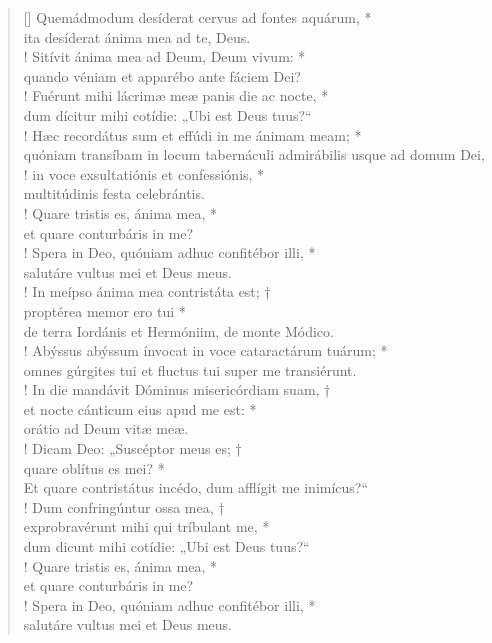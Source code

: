 \begin{verse}[\versewidth]
Quemádmodum desíderat cervus ad fontes aquárum, *\\
ita desíderat ánima mea ad te, Deus.\\!
\vin Sitívit ánima mea ad Deum, Deum vivum: *\\
\vin quando véniam et apparébo ante fáciem Dei?\\!
Fuérunt mihi lácrimæ meæ panis die ac nocte, *\\
dum dícitur mihi cotídie: „Ubi est Deus tuus?“\\!
\vin Hæc recordátus sum et effúdi in me ánimam meam; *\\
\vin quóniam transíbam in locum tabernáculi admirábilis usque ad domum Dei,\\!
in voce exsultatiónis et confessiónis, *\\
multitúdinis festa celebrántis.\\!
\vin Quare tristis es, ánima mea, *\\
\vin et quare conturbáris in me?\\!
Spera in Deo, quóniam adhuc confitébor illi, *\\
salutáre vultus mei et Deus meus.\\!
\vin In meípso ánima mea contristáta est; †\\
\vin proptérea memor ero tui *\\
\vin de terra Iordánis et Hermóniim, de monte Módico.\\!
Abýssus abýssum ínvocat in voce cataractárum tuárum; *\\
omnes gúrgites tui et fluctus tui super me transiérunt.\\!
\vin In die mandávit Dóminus misericórdiam suam, †\\
\vin et nocte cánticum eius apud me est: *\\
\vin orátio ad Deum vitæ meæ.\\!
Dicam Deo: „Suscéptor meus es; †\\
quare oblítus es mei? *\\
Et quare contristátus incédo, dum afflígit me inimícus?“\\!
\vin Dum confringúntur ossa mea, †\\
\vin exprobravérunt mihi qui tríbulant me, *\\
\vin dum dicunt mihi cotídie: „Ubi est Deus tuus?“\\!
Quare tristis es, ánima mea, *\\
et quare conturbáris in me?\\!
\vin Spera in Deo, quóniam adhuc confitébor illi, *\\
\vin salutáre vultus mei et Deus meus.\\
\end{verse}
\vspace{1cm}



